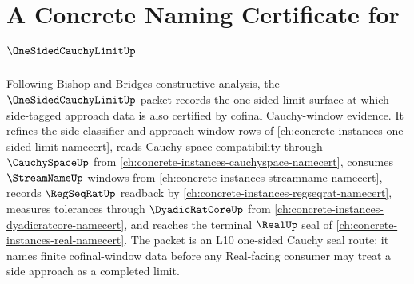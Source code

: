 \chapter{A Concrete Naming Certificate for $\OneSidedCauchyLimitUp$}
\label{ch:concrete-instances-one-sided-cauchy-limit-namecert}

Following Bishop and Bridges constructive analysis, the $\OneSidedCauchyLimitUp$ packet records the one-sided limit surface at which side-tagged approach data is also certified by cofinal Cauchy-window evidence. It refines the side classifier and approach-window rows of \autoref{ch:concrete-instances-one-sided-limit-namecert}, reads Cauchy-space compatibility through $\CauchySpaceUp$ from \autoref{ch:concrete-instances-cauchyspace-namecert}, consumes $\StreamNameUp$ windows from \autoref{ch:concrete-instances-streamname-namecert}, records $\RegSeqRatUp$ readback by \autoref{ch:concrete-instances-regseqrat-namecert}, measures tolerances through $\DyadicRatCoreUp$ from \autoref{ch:concrete-instances-dyadicratcore-namecert}, and reaches the terminal $\RealUp$ seal of \autoref{ch:concrete-instances-real-namecert}. The packet is an L10 one-sided Cauchy seal route: it names finite cofinal-window data before any Real-facing consumer may treat a side approach as a completed limit.

